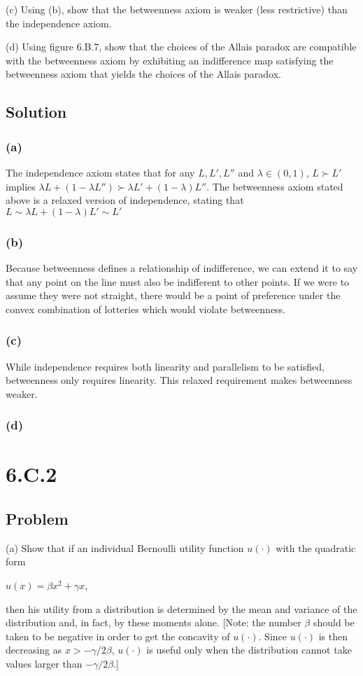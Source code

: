 \documentclass[10pt, a4paper]{article}
\begin{document}
    (c) Using (b), show that the betweenness axiom is weaker (less restrictive) than the independence axiom.

    (d) Using figure 6.B.7, show that the choices of the Allais paradox are compatible with the betweenness axiom by exhibiting an indifference map satisfying the betweenness axiom that yields the choices of the Allais paradox.
    \subsection*{Solution}
      \subsubsection*{(a)}
        The independence axiom states that for any $L,L',L''$ and $\lambda\in(0,1)$, $L\succ L'$ implies $\lambda L+(1-\lambda L'')\succ \lambda L'+(1-\lambda)L''$. The betweenness axiom stated above is a relaxed version of independence, stating that $L\sim\lambda L+(1-\lambda)L'\sim L'$ 
      \subsubsection*{(b)}
        Because betweenness defines a relationship of indifference, we can extend it to say that any point on the line must also be indifferent to other points. If we were to assume they were not straight, there would be a point of preference under the convex combination of lotteries which would violate betweenness. 
      \subsubsection*{(c)}
        While independence requires both linearity and parallelism to be satisfied, betweenness only requires linearity. This relaxed requirement makes betweenness weaker.
      \subsubsection*{(d)}
      
  \section*{6.C.2}
    \subsection*{Problem}
      (a) Show that if an individual Bernoulli utility function $u(\cdot)$ with the quadratic form
      \begin{center}
        $u(x) = \beta x^2+\gamma x$,
      \end{center}
      then his utility from a distribution is determined by the mean and variance of the distribution and, in fact, by these moments alone. [Note: the number $\beta$ should be taken to be negative in order to get the concavity of $u(\cdot)$. Since $u(\cdot)$ is then decreasing as $x>-\gamma/2\beta$, $u(\cdot)$ is useful only when the distribution cannot take values larger than $-\gamma/2\beta$.] 
\end{document}
